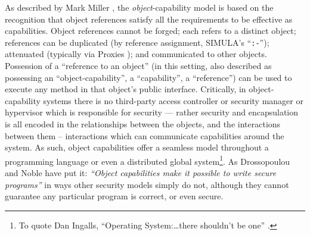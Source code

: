 As described by Mark Miller \cite{MillerPhD}, the
\textit{object}-capability model is based on the recognition that
object references satisfy all the requirements to be effective
as capabilities. Object references cannot be forged; each refers to a
distinct object; references can be duplicated (by reference
assignment, SIMULA's ``\texttt{:-}''); attenuated (typically via
Proxies \cite{gof,proxiesECOOP2013}); and communicated to other
objects. Possession of a ``reference to an object'' (in this setting,
also described as possessing an ``object-capability'', a
``capability'', a ``reference'') can be used to execute any method in
that object's public interface. Critically, in object-capability systems
there is no third-party access controller or security manager or
hypervisor which is responsible for security --- rather security and
encapsulation is all encoded in the relationships between the objects,
and the interactions between them -- interactions which can
communicate capabilities around the system.  As such, object
capabilities offer a seamless model throughout a programming language or
even a distributed global system\footnote{To quote Dan Ingalls,
``Operating System:\ldots there shouldn't be one''
\cite{ingalls1981}.}.  As Drossopoulou and Noble have put it:
\textit{``Object capabilities make it possible to write secure
  programs''} \cite{capeFTfJP} in ways other security models simply do
not, although they cannot guarantee any particular program is correct,
or even secure.












